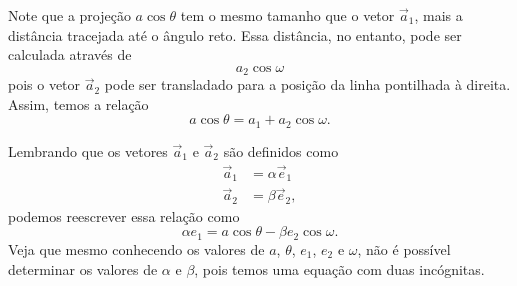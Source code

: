 Note que a projeção $a\cos\theta$ tem o mesmo tamanho que o vetor $\vec{a}_1$, mais a distância tracejada até o ângulo reto. Essa distância, no entanto, pode ser calculada através de 
\begin{displaymath}
    a_2\cos\omega
\end{displaymath}
%
pois o vetor $\vec{a}_2$ pode ser transladado para a posição da linha pontilhada à direita. Assim, temos a relação
\begin{equation}
    a\cos\theta = a_1 + a_2\cos\omega.
\end{equation}

Lembrando que os vetores $\vec{a}_1$ e $\vec{a}_2$ são definidos como
\begin{align*}
    \vec{a}_1 &= \alpha \vec{e}_1 \\
    \vec{a}_2 &= \beta \vec{e}_2,
\end{align*}
%
podemos reescrever essa relação como
\begin{equation}
    \alpha e_1 = a\cos\theta - \beta e_2 \cos\omega.
\end{equation}
%
Veja que mesmo conhecendo os valores de $a$, $\theta$, $e_1$, $e_2$ e $\omega$, não é possível determinar os valores de $\alpha$ e $\beta$, pois temos uma equação com duas incógnitas.

